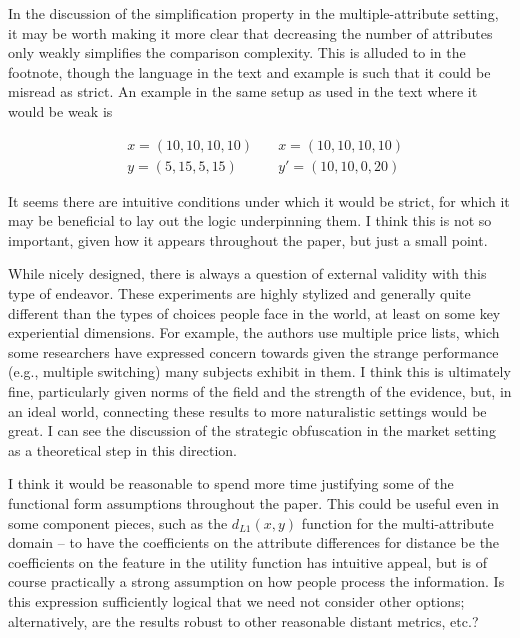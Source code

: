 \documentclass[12pt]{article}
\begin{document}
\hrulefill\hspace{0.5em}\dotfill\hspace{0.5em}\hrulefill

In the discussion of the simplification property in 
the multiple-attribute setting, 
it may be worth making it more clear that 
decreasing the number of attributes 
only weakly simplifies the comparison complexity.
This is alluded to in the footnote, though the language in the 
text and
example is such that it could be misread as strict.
An example in the same setup as used in the text where it 
would be weak is

\begin{align}
    &x = (10, 10, 10, 10) \quad &x = (10, 10, 10, 10) \\
    &y = (5, 15, 5, 15) \quad &y' = (10, 10, 0, 20)
\end{align}

It seems there are intuitive conditions under which it would 
be strict, for which it may be beneficial to lay out the logic
underpinning them.
I think this is not so important, given how it appears 
throughout the paper, but just a small point.

\hrulefill\hspace{0.5em}\dotfill\hspace{0.5em}\hrulefill

While nicely designed, there is always a question of 
external validity with this type of endeavor.
These experiments are highly stylized and 
generally quite different than the types of choices 
people face in the world, at least on some key experiential 
dimensions. For example, the authors use 
multiple price lists, which some researchers 
have expressed concern towards given 
the strange performance (e.g., multiple switching) 
many subjects exhibit in them.
I think this is ultimately fine, 
particularly given norms of the field
and the strength of the evidence, 
but, in an ideal world,
connecting these results to more naturalistic settings would be great.
I can see the discussion of the strategic
obfuscation in the market setting as a theoretical step in this direction.

\hrulefill\hspace{0.5em}\dotfill\hspace{0.5em}\hrulefill

I think it would be reasonable to spend more time justifying 
some of the functional form assumptions throughout the paper.
This could be useful even in some component pieces,
such as the $d_{L1}(x,y)$ function for 
the multi-attribute domain -- to have the coefficients on the 
attribute differences for distance be the coefficients on the
feature in the utility function has intuitive appeal,
but is of course practically a strong assumption on how
people process the information. Is this expression
sufficiently logical that we need not consider other options; alternatively, 
are the results robust to other reasonable distant metrics, etc.? 
\end{document}
